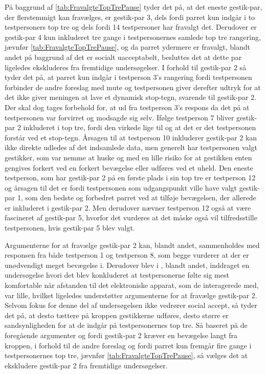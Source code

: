 På baggrund af \autoref{tab:FravalgteTopTrePause} tyder det på, at det eneste gestik-par, der flerstemmigt kan fravælges, er gestik-par 3, dels fordi parret kun indgår i to testpersoners top tre og dels fordi 14 testpersoner har fravalgt det. Derudover er gestik-par 4 kun inkluderet tre gange i testpersonernes samlede top tre rangering, jævnfør \autoref{tab:FravalgteTopTrePause}, og da parret ydermere er fravalgt, blandt andet på baggrund af det er socialt uacceptabelt, besluttes det at dette par ligeledes ekskluderes fra fremtidige undersøgelser. I forhold til gestik-par 2 så tyder det på, at parret kun indgår i testperson 3's rangering fordi testpersonen forbinder de andre foreslag med mute og testpersonen giver derefter udtryk for at det ikke giver meningen at lave et dynamisk stop-tegn, svarende til gestik-par 2. Der skal dog tages forbehold for, at ud fra testperson 3's respons da det på at testpersonen var forvirret og modsagde sig selv. Ifølge testperson 7 bliver gestik-par 2 inkluderet i top tre, fordi den virkede lige til og at det er det testpersonen forstår ved et stop-tegn. Årsagen til at testperson 10 inkluderer gestik-par 2 kan ikke direkte udledes af det indsamlede data, men generelt har testpersonen valgt gestikker, som var nemme at huske og med en lille risiko for at gestikken enten gengives forkert ved en forkert bevægelse eller udføres ved et uheld. Den eneste testperson, som har gestik-par 2 på en første plads i sin top tre er testperson 12 og årsagen til det er fordi testpersonen som udgangspunkt ville have valgt gestik-par 1, som den bedste og forbedret parret ved at tilføje bevægelsen, der allerede er inkluderet i gestik-par 2. Men derudover nævner testperson 12 også at være fascineret af gestik-par 5, hvorfor det vurderes at det måske også vil tilfredsstille testpersonen, hvis gestik-par 5 blev valgt. 

Argumenterne for at fravælge gestik-par 2 kan, blandt andet, sammenholdes med responsen fra både testperson 1 og testperson 8, som begge vurderer at der er unødvendigt meget bevægelse i. Derudover blev i , blandt andet, inddraget en undersøgelse hvori det blev konkluderet at testpersonerne følte sig mest komfortable når afstanden til det elektroniske apparat, som de interagerede med, var lille, hvilket ligeledes understøtter argumenterne for at fravælge gestik-par 2. Selvom fokus for denne del af undersøgelsen ikke vedrører social accept, så tyder det på, at desto tættere på kroppen gestikkerne udføres, desto større er sandsynligheden for at de indgår på testpersonernes top tre. Så baseret på de foregående argumenter og fordi gestik-par 2 kræver en bevægelse langt fra kroppen, i forhold til de andre foreslag og fordi parret kun fremgår fire gange i testpersonernes top tre, jævnfør \autoref{tab:FravalgteTopTrePause}, så vælges det at ekskludere gestik-par 2 fra fremtidige undersøgelser. 
%
